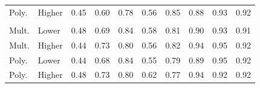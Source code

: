 \documentclass[12pt, twoside]{amherstthesis}
\begin{document}
\begin{table}
\begin{tabular}[t]{llrrrrrrrr}
\hspace{1em}Poly. & Higher & 0.45 & 0.60 & 0.78 & 0.56 & 0.85 & 0.88 & 0.93 & 0.92\\
\addlinespace[0.3em]
\multicolumn{10}{l}{\textbf{Hg-Ni-Tl}}\\
\hspace{1em}Mult. & Lower & 0.48 & 0.69 & 0.84 & 0.58 & 0.81 & 0.90 & 0.93 & 0.91\\
\hspace{1em}Mult. & Higher & 0.44 & 0.73 & 0.80 & 0.56 & 0.82 & 0.94 & 0.95 & 0.92\\
\hspace{1em}Poly. & Lower & 0.44 & 0.68 & 0.84 & 0.55 & 0.79 & 0.89 & 0.95 & 0.92\\
\hspace{1em}Poly. & Higher & 0.48 & 0.73 & 0.80 & 0.62 & 0.77 & 0.94 & 0.92 & 0.92\\
\bottomrule
\end{tabular}
\end{table}
\end{document}
